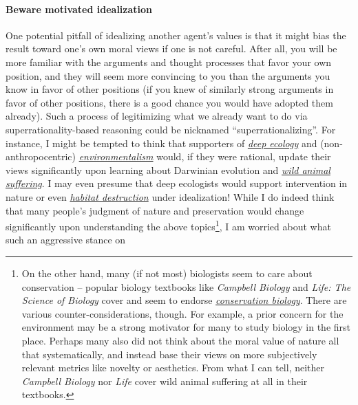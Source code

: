 \paragraph{Beware motivated
idealization}\label{beware-motivated-idealization}

One potential pitfall of idealizing another agent's values is that it
might bias the result toward one's own moral views if one is not
careful. After all, you will be more familiar with the arguments and
thought processes that favor your own position, and they will seem more
convincing to you than the arguments you know in favor of other
positions (if you knew of similarly strong arguments in favor of other
positions, there is a good chance you would have adopted them already).
Such a process of legitimizing what we already want to do via
superrationality-based reasoning could be nicknamed
``superrationalizing''. For instance, I might be tempted to think that
supporters of
\href{https://en.wikipedia.org/wiki/Deep_ecology}{\emph{deep ecology}}
and (non-anthropocentric)
\href{https://en.wikipedia.org/wiki/Environmentalism}{\emph{environmentalism}}
would, if they were rational, update their views significantly upon
learning about Darwinian evolution and
\href{https://foundational-research.org/the-importance-of-wild-animal-suffering/}{\emph{wild
animal suffering}}. I may even presume that deep ecologists would
support intervention in nature or even
\href{http://reducing-suffering.org/habitat-destruction-not-preservation-generally-reduces-wild-animal-suffering/}{\emph{habitat
destruction}} under idealization! While I do indeed think that many
people's judgment of nature and preservation would change significantly
upon understanding the above topics\footnote{On the other hand, many (if
  not most) biologists seem to care about conservation -- popular
  biology textbooks like \parencite{Urry2016-ey}
  \emph{Campbell Biology} and \parencite{Sadava2012-er}
  \emph{Life: The Science of Biology} cover and seem to endorse
  \href{https://en.wikipedia.org/wiki/Conservation_biology}{\emph{conservation
  biology}}. There are various counter-considerations, though. For
  example, a prior concern for the environment may be a strong motivator
  for many to study biology in the first place. Perhaps many also did
  not think about the moral value of nature all that systematically, and
  instead base their views on more subjectively relevant metrics like
  novelty or aesthetics. From what I can tell, neither \emph{Campbell
  Biology} nor \emph{Life} cover wild animal suffering at all in their
  textbooks.}, I am worried about what such an aggressive stance on
